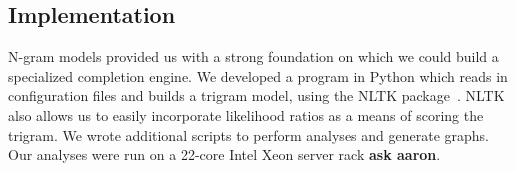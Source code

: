 \subsection{Implementation}

N-gram models provided us with a strong foundation on which we could build a specialized completion engine. We developed a program in Python which reads in configuration files and builds a trigram model, using the NLTK package~\cite{nltk}. NLTK also allows us to easily incorporate likelihood ratios as a means of scoring the trigram. We wrote additional scripts to perform analyses and generate graphs. Our analyses were run on a 22-core Intel Xeon server rack \textbf{ask aaron}.\\ 



